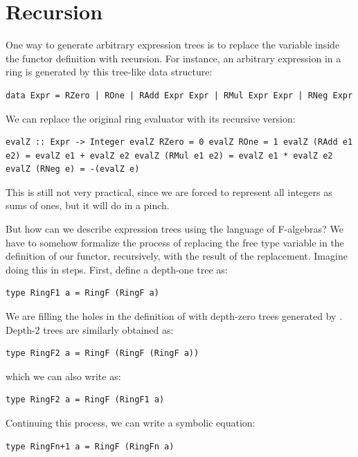 \section{Recursion}\label{recursion}

One way to generate arbitrary expression trees is to replace the
variable  inside the functor definition with recursion. For
instance, an arbitrary expression in a ring is generated by this
tree-like data structure:

\begin{verbatim}
data Expr = RZero | ROne | RAdd Expr Expr | RMul Expr Expr | RNeg Expr
\end{verbatim}

We can replace the original ring evaluator with its recursive version:

\begin{verbatim}
evalZ :: Expr -> Integer evalZ RZero = 0 evalZ ROne = 1 evalZ (RAdd e1 e2) = evalZ e1 + evalZ e2 evalZ (RMul e1 e2) = evalZ e1 * evalZ e2 evalZ (RNeg e) = -(evalZ e)
\end{verbatim}

This is still not very practical, since we are forced to represent all
integers as sums of ones, but it will do in a pinch.

But how can we describe expression trees using the language of
F-algebras? We have to somehow formalize the process of replacing the
free type variable in the definition of our functor, recursively, with
the result of the replacement. Imagine doing this in steps. First,
define a depth-one tree as:

\begin{verbatim}
type RingF1 a = RingF (RingF a)
\end{verbatim}

We are filling the holes in the definition of  with
depth-zero trees generated by . Depth-2 trees are
similarly obtained as:

\begin{verbatim}
type RingF2 a = RingF (RingF (RingF a))
\end{verbatim}

which we can also write as:

\begin{verbatim}
type RingF2 a = RingF (RingF1 a)
\end{verbatim}

Continuing this process, we can write a symbolic equation:

\begin{verbatim}
type RingFn+1 a = RingF (RingFn a)
\end{verbatim}

